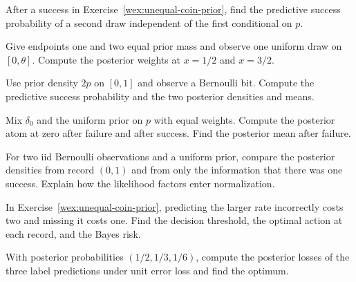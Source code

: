 \documentclass[11pt,oneside]{book}
\theoremstyle{definition}
\theoremstyle{remark}
\begin{document}
\begin{practiceexercise}
\label{wex:next-bit-prediction}
After a success in Exercise~\ref{wex:unequal-coin-prior}, find the
predictive success probability of a second draw independent of the first
conditional on $p$.
\end{practiceexercise}

\begin{practiceexercise}
\label{wex:endpoint-posterior-update}
Give endpoints one and two equal prior mass and observe one uniform draw on
$[0,\theta]$. Compute the posterior weights at $x=1/2$ and $x=3/2$.
\end{practiceexercise}

\begin{practiceexercise}
\label{wex:increasing-prior-binary}
Use prior density $2p$ on $[0,1]$ and observe a Bernoulli bit. Compute the
predictive success probability and the two posterior densities and means.
\end{practiceexercise}

\begin{practiceexercise}
\label{wex:prior-atom-survives}
Mix $\delta_0$ and the uniform prior on $p$ with equal weights. Compute the
posterior atom at zero after failure and after success. Find the posterior
mean after failure.
\end{practiceexercise}

\begin{practiceexercise}
\label{wex:count-posterior-same}
For two iid Bernoulli observations and a uniform prior, compare the
posterior densities from record $(0,1)$ and from only the information that
there was one success. Explain how the likelihood factors enter
normalization.
\end{practiceexercise}

\begin{practiceexercise}
\label{wex:asymmetric-posterior-threshold}
In Exercise~\ref{wex:unequal-coin-prior}, predicting the larger
rate incorrectly costs two and missing it costs one. Find the decision
threshold, the optimal action at each record, and the Bayes risk.
\end{practiceexercise}

\begin{practiceexercise}
\label{wex:three-class-posterior-mode}
With posterior probabilities $(1/2,1/3,1/6)$, compute the posterior losses
of the three label predictions under unit error loss and find the optimum.
\end{practiceexercise}
\end{document}
